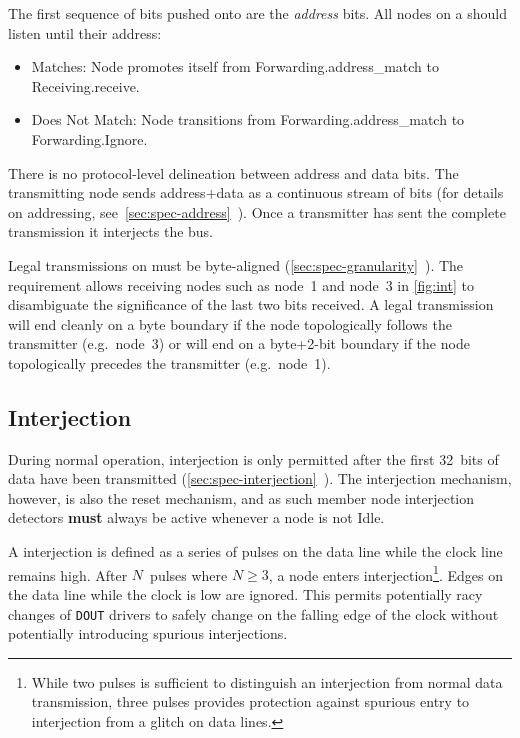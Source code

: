 The first sequence of bits pushed onto \bus are the {\em address} bits. All
nodes on a \bus should listen until their address:
\begin{itemize}
  \item Matches: Node promotes itself from Forwarding.{\sc address\_match} to
    Receiving.{\sc receive}.
  \item Does Not Match: Node transitions from Forwarding.{\sc address\_match}
    to Forwarding.{\sc Ignore}.
\end{itemize}

There is no protocol-level delineation between address and data bits. The
transmitting node sends address$+$data as a continuous stream of bits (for
details on \bus addressing,
see~\ref{sec:spec-address}~). Once a transmitter has
sent the complete transmission it interjects the bus.

Legal transmissions on \bus must be byte-aligned
(\ref{sec:spec-granularity}~). The requirement
allows receiving nodes such as node~1 and node~3 in \cref{fig:int}
to disambiguate the significance of the last two bits received. A legal
transmission will end cleanly on a byte boundary if the node topologically
follows the transmitter (e.g.~node~3) or will end on a byte+2-bit boundary if
the node topologically precedes the transmitter (e.g.~node~1).

\subsection{Interjection}
\label{sec:bus-interjection}
During normal operation, interjection is only permitted after the first
32~bits of data have been transmitted
(\ref{sec:spec-interjection}~). The
interjection mechanism, however, is also the \bus reset mechanism, and as such
member node interjection detectors {\bf must} always be active whenever a node
is not Idle.

A \bus interjection is defined as a series of pulses on the data line while the
clock line remains high. After $N$~pulses where $N \ge 3$, a node enters
interjection\footnote{
  While two pulses is sufficient to distinguish an interjection from normal
  data transmission, three pulses provides protection against spurious entry
  to interjection from a glitch on data lines.}.
Edges on the data line while the clock is low are ignored. This permits
potentially racy changes of {\tt DOUT} drivers to safely change on the falling
edge of the clock without potentially introducing spurious interjections.

